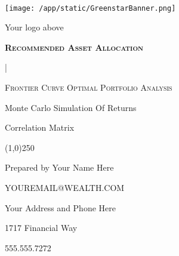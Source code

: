 \documentclass{article}
\begin{document}
\begin{titlepage}   %

\begin{center}
	{\scshape\Large\bfseries \, \par}
	\vspace{5cm}


	\texttt{[image: /app/static/GreenstarBanner.png]}\par
    \vspace{-.2cm}

	Your logo above



	\vspace{0,5cm}
	{\scshape\Large\bfseries Recommended Asset Allocation

	{} | {} \par}
	\vspace{0,5cm}
	{\scshape\normalsize Frontier Curve Optimal Portfolio Analysis

	Monte Carlo Simulation Of Returns

	Correlation Matrix \par}
\end{center}

	\begin{center}
\line(1,0){250}
\end{center}

	\begin{center}
	 	{
		\small{
		Prepared by Your Name Here

		YOUREMAIL@WEALTH.COM}
		\par}


	\vfill
\end{center}

	\vfill

	{\begin{center}

    	 Your Address and Phone Here

	     1717 Financial Way

	     555.555.7272

	\end{center}}

\end{titlepage}


\tableofcontents    %

\begin{center}
\vfill
\vfill

\end{center}
\justify
\end{document}
